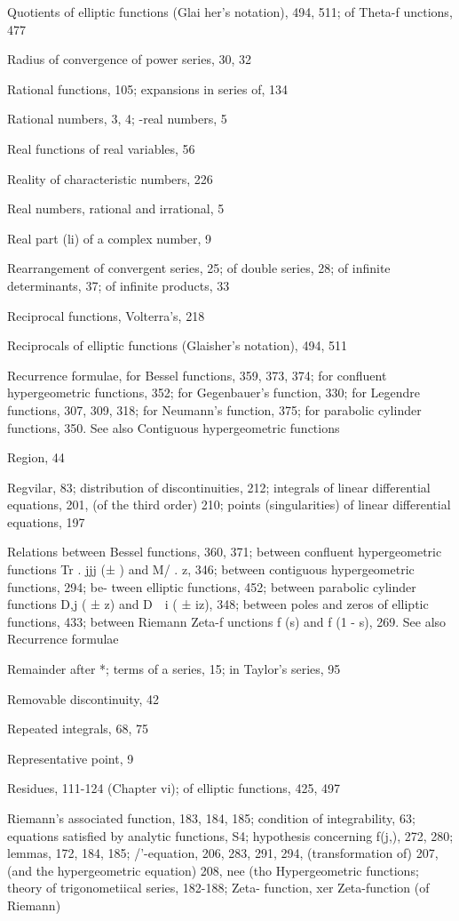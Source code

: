 Quotients of elliptic functions (Glai her's notation), 494, 511; of Theta-f unctions, 477

Radius of convergence of power series, 30, 32

Rational functions, 105; expansions in series of, 134

Rational numbers, 3, 4; -real numbers, 5

Real functions of real variables, 56

Reality of characteristic numbers, 226

Real numbers, rational and irrational, 5

Real part (li) of a complex number, 9

Rearrangement of convergent series, 25; of double series, 28; of infinite determinants, 37; of
infinite products, 33

Reciprocal functions, Volterra's, 218

Reciprocals of elliptic functions (Glaisher's notation), 494, 511

Recurrence formulae, for Bessel functions, 359, 373, 374; for confluent hypergeometric functions,
352; for Gegenbauer's function, 330; for Legendre functions, 307, 309, 318; for Neumann's
function, 375; for parabolic cylinder functions, 350. See also Contiguous hypergeometric
functions

Region, 44

Regvilar, 83; distribution of discontinuities, 212; integrals of linear differential equations, 201,
(of the third order) 210; points (singularities) of linear differential equations, 197

Relations between Bessel functions, 360, 371; between confluent hypergeometric functions
Tr\; . jjj (± ) and M/ .    z, 346; between contiguous hypergeometric functions, 294; be-
tween elliptic functions, 452; between parabolic cylinder functions D,j ( ± z) and D\  \ i ( ± iz),
348; between poles and zeros of elliptic functions, 433; between Riemann Zeta-f unctions
f (s) and f (1 - s), 269. See also Recurrence formulae

Remainder after *; terms of a series, 15; in Taylor's series, 95

Removable discontinuity, 42

Repeated integrals, 68, 75

Representative point, 9

Residues, 111-124 (Chapter vi); of elliptic functions,
425, 497

%
%
Riemann's associated function, 183, 184, 185; condition of integrability, 63; equations satisfied
by analytic functions, S4; hypothesis concerning f(j,), 272, 280; lemmas, 172, 184, 185;
/'-equation, 206, 283, 291, 294, (transformation of) 207, (and the hypergeometric equation)
208, nee (tho Hypergeometric functions; theory of trigonometiical series, 182-188; Zeta-
function, xer Zeta-function (of Riemann)

